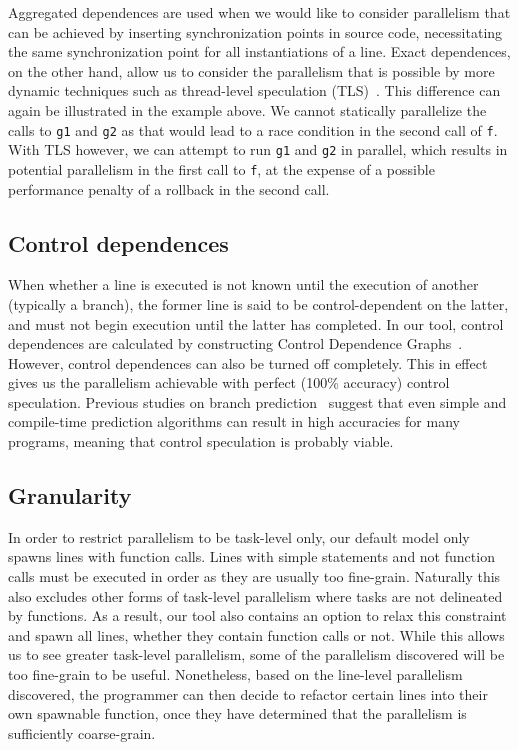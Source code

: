 Aggregated dependences are used when we would like to consider parallelism that can be achieved by inserting synchronization points in source code, necessitating the same synchronization point for all instantiations of a line.
Exact dependences, on the other hand, allow us to consider the parallelism that is possible by more dynamic techniques such as thread-level speculation (TLS)~\cite{Rundberg01anall-software,gregory05stampede, welc05safe}.
This difference can again be illustrated in the example above.
We cannot statically parallelize the calls to \texttt{g1} and \texttt{g2} as that would lead to a race condition in the second call of \texttt{f}.
With TLS however, we can attempt to run \texttt{g1} and \texttt{g2} in parallel, which results in potential parallelism in the first call to \texttt{f}, at the expense of a possible performance penalty of a rollback in the second call.

\subsection{Control dependences}
When whether a line is executed is not known until the execution of another (typically a branch), the former line is said to be control-dependent on the latter, and must not begin execution until the latter has completed.
In our tool, control dependences are calculated by constructing Control Dependence Graphs~\cite{ferrante87program}.
However, control dependences can also be turned off completely.
This in effect gives us the parallelism achievable with perfect (100\% accuracy) control speculation.
Previous studies on branch prediction~\cite{smith98study} suggest that even simple and compile-time prediction algorithms can result in high accuracies for many programs, meaning that control speculation is probably viable.

\subsection{Granularity}
In order to restrict parallelism to be task-level only, our default model only spawns lines with function calls.
Lines with simple statements and not function calls must be executed in order as they are usually too fine-grain.
Naturally this also excludes other forms of task-level parallelism where tasks are not delineated by functions.
As a result, our tool also contains an option to relax this constraint and spawn all lines, whether they contain function calls or not.
While this allows us to see greater task-level parallelism, some of the parallelism discovered will be too fine-grain to be useful.
Nonetheless, based on the line-level parallelism discovered, the programmer can then decide to refactor certain lines into their own spawnable function, once they have determined that the parallelism is sufficiently coarse-grain.

